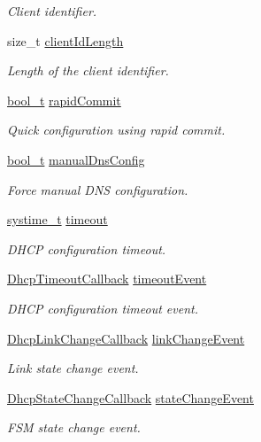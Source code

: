 \begin{DoxyCompactItemize}
\begin{DoxyCompactList}\small\item\em Client identifier. \end{DoxyCompactList}\item 
size\+\_\+t \hyperlink{structDhcpClientSettings_a9a6950d7dd613c04b2ab460aadd42e90}{client\+Id\+Length}
\begin{DoxyCompactList}\small\item\em Length of the client identifier. \end{DoxyCompactList}\item 
\hyperlink{compiler__port_8h_a812d16e5494522586b3784e55d479912}{bool\+\_\+t} \hyperlink{structDhcpClientSettings_a824a4ad21fbf02c2011db3e572e73d8c}{rapid\+Commit}
\begin{DoxyCompactList}\small\item\em Quick configuration using rapid commit. \end{DoxyCompactList}\item 
\hyperlink{compiler__port_8h_a812d16e5494522586b3784e55d479912}{bool\+\_\+t} \hyperlink{structDhcpClientSettings_a3e36da043ea469f06c40e0ad0ede8929}{manual\+Dns\+Config}
\begin{DoxyCompactList}\small\item\em Force manual D\+NS configuration. \end{DoxyCompactList}\item 
\hyperlink{compiler__port_8h_ae3e32a98d431a02106616da3071832dd}{systime\+\_\+t} \hyperlink{structDhcpClientSettings_a495c8cbe9aea2df4028d4fb89bce982e}{timeout}
\begin{DoxyCompactList}\small\item\em D\+H\+CP configuration timeout. \end{DoxyCompactList}\item 
\hyperlink{dhcp__client_8h_a14e8927cda032ddc5ec3993d38d46109}{Dhcp\+Timeout\+Callback} \hyperlink{structDhcpClientSettings_ab680b600ec887dfb4369b3f2fa4f9538}{timeout\+Event}
\begin{DoxyCompactList}\small\item\em D\+H\+CP configuration timeout event. \end{DoxyCompactList}\item 
\hyperlink{dhcp__client_8h_a008d4a3a83cb2d68f003bd9668f7e2c7}{Dhcp\+Link\+Change\+Callback} \hyperlink{structDhcpClientSettings_a4bdc4bcc6332d448cee3df568ce7b514}{link\+Change\+Event}
\begin{DoxyCompactList}\small\item\em Link state change event. \end{DoxyCompactList}\item 
\hyperlink{dhcp__client_8h_a89e859af4d5fbfc33096ffc3592cf935}{Dhcp\+State\+Change\+Callback} \hyperlink{structDhcpClientSettings_a3451c1403597e35592da1957bbd803d9}{state\+Change\+Event}
\begin{DoxyCompactList}\small\item\em F\+SM state change event. \end{DoxyCompactList}\end{DoxyCompactItemize}


